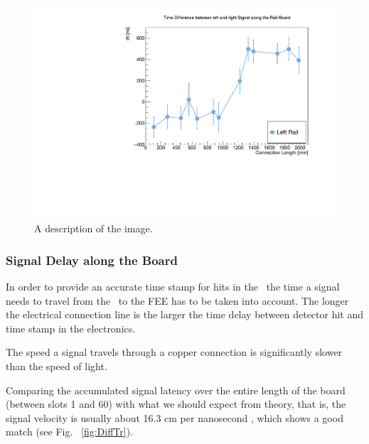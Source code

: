 \documentclass[../BTOF_summary.tex]{subfiles}
\begin{document}
\begin{figure}[h!]
    \centering
    \includegraphics[scale=0.5]{Pictures/TimeDiff_leftRight.pdf}
    \caption{A description of the image.}
    \label{fig:Diff}
\end{figure}

\subsubsection{Signal Delay along the Board}

In order to provide an accurate time stamp for hits in the \btofD\ the time a signal needs to travel from the \sipms\ to the FEE has to be taken into account. The longer the electrical connection line is the larger the time delay between detector hit and time stamp in the electronics.

The speed a signal travels through a copper connection is significantly slower than the speed of light.

Comparing the accumulated signal latency over the entire length of the board (between slots 1 and 60) with what we should expect from theory, that is, the signal velocity is usually about 16.3 cm per nanosecond \cite{bril,paul}, which shows a good match (see Fig. ~\ref{fig:DiffTr}).
\end{document}
